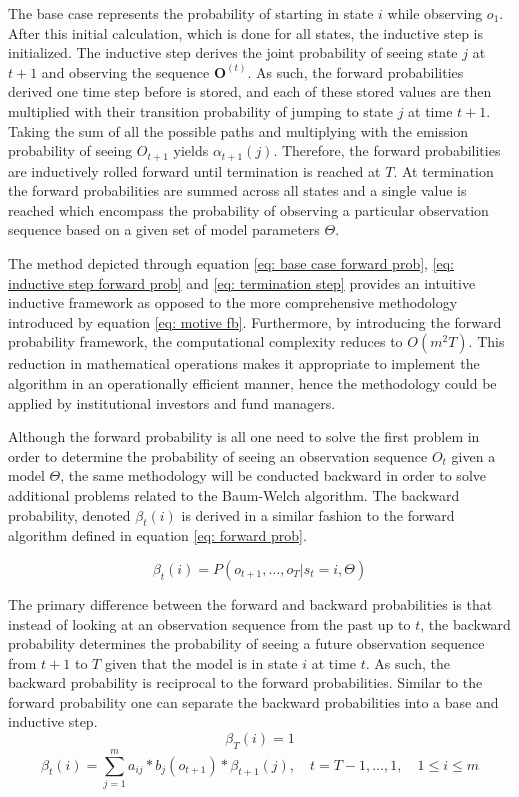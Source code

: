 The base case represents the probability of starting in state $i$ while observing $o_1$. After this initial calculation, which is done for all states, the inductive step is initialized. The inductive step derives the joint probability of seeing state $j$ at $t+1$ and observing the sequence $\mathbf{O}^{(t)}$. As such, the forward probabilities derived one time step before is stored, and each of these stored values are then multiplied with their transition probability of jumping to state $j$ at time $t+1$. Taking the sum of all the possible paths and multiplying with the emission probability of seeing $O_{t+1}$ yields $\alpha_{t+1}(j)$. Therefore, the forward probabilities are inductively rolled forward until termination is reached at $T$. At termination the forward probabilities are summed across all states and a single value is reached which encompass the probability of observing a particular observation sequence based on a given set of model parameters $\Theta$.

The method depicted through equation \ref{eq: base case forward prob}, \ref{eq: inductive step forward prob} and \ref{eq: termination step} provides an intuitive inductive framework as opposed to the more comprehensive methodology introduced by equation \ref{eq: motive fb}. Furthermore, by introducing the forward probability framework, the computational complexity reduces to $O(m^2T)$. This reduction in mathematical operations makes it appropriate to implement the algorithm in an operationally efficient manner, hence the methodology could be applied by institutional investors and fund managers. 

Although the forward probability is all one need to solve the first problem in order to determine the probability of seeing an observation sequence $O_t$ given a model $\Theta$, the same methodology will be conducted backward in order to solve additional problems related to the Baum-Welch algorithm. The backward probability, denoted $\beta_t(i)$ is derived in a similar fashion to the forward algorithm defined in equation \ref{eq: forward prob}.

\begin{equation}
    \beta_t(i) = P(o_{t+1},\ldots,o_T | s_t = i, \Theta) 
\end{equation}

The primary difference between the forward and backward probabilities is that instead of looking at an observation sequence from the past up to $t$, the backward probability determines the probability of seeing a future observation sequence from $t+1$ to $T$ given that the model is in state $i$ at time $t$. As such, the backward probability is reciprocal to the forward probabilities. Similar to the forward probability one can separate the backward probabilities into a base and inductive step. 
\begin{equation}
    \beta_T(i) = 1 %
    \label{eq: base backward}
\end{equation}
\begin{equation}
   \beta_t(i) = \sum_{j=1}^m a_{ij}*b_j(o_{t+1})*\beta_{t+1}(j),
   \quad t = T-1,\ldots,1,
   \quad 1\leq i \leq m
    \label{eq: Inductive backward}
\end{equation}

